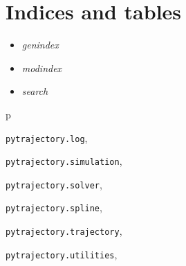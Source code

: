 \documentclass[letterpaper,10pt,english]{sphinxmanual}
\begin{document}

\begin{fulllineitems}
\label{pytrajectory:pytrajectory.log.logtime}
\end{fulllineitems}


\begin{fulllineitems}
\label{pytrajectory:pytrajectory.log.warn}
\end{fulllineitems}


\begin{fulllineitems}
\label{pytrajectory:pytrajectory.log.error}
\end{fulllineitems}



\chapter{Indices and tables}
\label{index:indices-and-tables}\begin{itemize}
\item {} 
\emph{genindex}

\item {} 
\emph{modindex}

\item {} 
\emph{search}

\end{itemize}


\renewcommand{\indexname}{Python Module Index}
\begin{theindex}
\def\bigletter#1{{\Large\sffamily#1}\nopagebreak\vspace{1mm}}
\bigletter{p}
\item {\texttt{pytrajectory.log}}, \pageref{pytrajectory:module-pytrajectory.log}
\item {\texttt{pytrajectory.simulation}}, \pageref{pytrajectory:module-pytrajectory.simulation}
\item {\texttt{pytrajectory.solver}}, \pageref{pytrajectory:module-pytrajectory.solver}
\item {\texttt{pytrajectory.spline}}, \pageref{pytrajectory:module-pytrajectory.spline}
\item {\texttt{pytrajectory.trajectory}}, \pageref{pytrajectory:module-pytrajectory.trajectory}
\item {\texttt{pytrajectory.utilities}}, \pageref{pytrajectory:module-pytrajectory.utilities}
\end{theindex}

\renewcommand{\indexname}{Index}
\printindex
\end{document}
